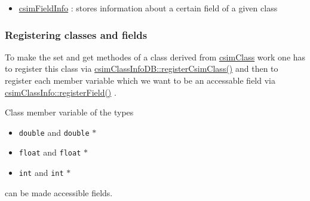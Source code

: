 \begin{itemize}
\item \hyperlink{classcsimFieldInfo}{csim\-Field\-Info} : stores information about a certain field of a given class\end{itemize}
\hypertarget{fields_fields_reg}{}\subsubsection{Registering classes and fields}\label{fields_fields_reg}
To make the set and get methodes of a class derived from \hyperlink{classcsimClass}{csim\-Class} work one has to register this class via \hyperlink{classcsimClassInfoDB_a2}{csim\-Class\-Info\-DB::register\-Csim\-Class()} and then to register each member variable which we want to be an accessable field via \hyperlink{classcsimClassInfo_z1_0}{csim\-Class\-Info::register\-Field()} .

Class member variable of the types

\begin{itemize}
\item {\tt double} and {\tt double} $\ast$\item {\tt float} and {\tt float} $\ast$\item {\tt int} and {\tt int} $\ast$\end{itemize}


can be made accessible fields.


